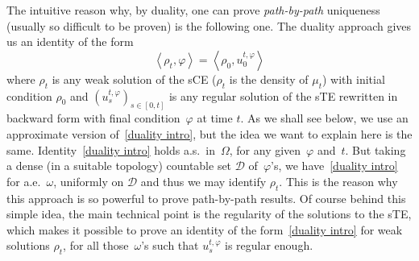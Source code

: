 \documentclass[a4paper,10pt]{article}
\newcommand\1{\mathbbm{1}}
\numberwithin{equation}{section}
\begin{document}
The intuitive reason why, by duality, one can prove \textit{path-by-path} uniqueness (usually so difficult to be proven) is the following one. The duality approach gives us an identity of the form 
\begin{equation}
\left\langle \rho_{t},\varphi\right\rangle =\left\langle \rho_{0} 
,u_{0}^{t,\varphi}\right\rangle \label{duality intro} 
\end{equation}
where $\rho_{t}$ is any weak solution of the sCE ($\rho_{t}$ is the density of $\mu_{t}$) with initial condition $\rho_{0}$ and $\left(  u_{s}^{t,\varphi
}\right)  _{s\in\left[  0,t\right]  }$ is any regular solution of the sTE rewritten in backward form with final condition~$\varphi$ at time $t$. As we
shall see below, we use an approximate version of~\eqref{duality intro}, but the idea we want to explain here is the same. Identity~\eqref{duality intro}
holds a.s.~in~$\Omega$, for any given~$\varphi$ and~$t$. But taking a dense (in a suitable topology) countable set $\mathcal{D}$ of~$\varphi$'s, we 
have~\eqref{duality intro} for a.e.~$\omega$, uniformly on $\mathcal{D}$ and thus we may identify $\rho_{t}$. This is the reason why this approach is so powerful to prove path-by-path results. Of course behind this simple idea, the main technical point is the regularity of the solutions to the sTE, which
makes it possible to prove an identity of the form~\eqref{duality intro} for weak solutions $\rho_{t}$, for all those~$\omega$'s such that $u_{s}^{t,\varphi}$
is regular enough.
\end{document}
